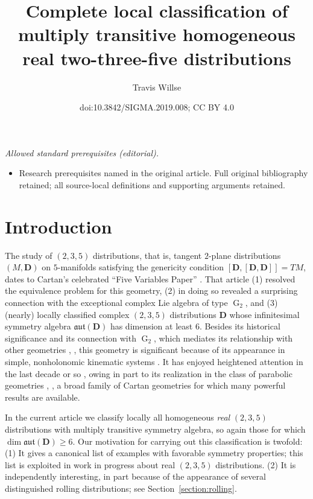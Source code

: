 \documentclass[10pt,a4paper]{amsart}
\title{Complete local classification of multiply transitive homogeneous real two-three-five distributions}
\author{Travis Willse}
\date{doi:10.3842/SIGMA.2019.008; CC BY 4.0}
\DeclareMathOperator{\G} {G}
\newcommand{\mbD}{\mathbf{D}}
\newcommand{\mfaut}{\mathfrak{aut}}
\numberwithin{equation}{section}
\begin{document}
\maketitle
\noindent\textit{Allowed standard prerequisites (editorial).}\begin{itemize}
\item Research prerequisites named in the original article. Full original bibliography retained; all source-local definitions and supporting arguments retained.
\end{itemize}\medskip
\section{Introduction}

The study of $(2, 3, 5)$ distributions, that is, tangent $2$-plane distributions $(M, \mbD)$ on $5$-manifolds satisfying the genericity condition $[\mbD, [\mbD, \mbD]] = TM$, dates to Cartan's celebrated ``Five Variables Paper'' \cite{CartanFiveVariables}. That article (1) resolved the equivalence problem for this geometry, (2) in doing so revealed a surprising connection with the exceptional complex Lie algebra of type $\G_2$, and (3) (nearly) locally classified complex $(2, 3, 5)$ distributions $\mbD$ whose infinitesimal symmetry algebra $\mfaut(\mbD)$ has dimension at least $6$. Besides its historical significance and its connection with $\G_2$, which mediates its relationship with other geometries \cite{CapSagerschnig, GPW, GrahamWillse, HammerlSagerschnig, HammerlSagerschnigTwistor, LeistnerNurowski, LNS}, \cite[Section~5]{Nurowski}, this geometry is significant because of its appearance in simple, nonholonomic kinematic systems \cite{BorMontgomery, BryantHsu}. It has enjoyed heightened attention in the last decade or so \cite{AnNurowski, AnNurowskiPlebanskiMetric, DaveHaller, DoubrovGovorovCounterexample, DHS, DoubrovKruglikov, IKTY, IKY, Randall,SagerschnigWillseOperator, SagerschnigWillseGeometry, Strazzullo, WillseHeisenberg, WillseCounterexample}, owing in part to its realization in the class of parabolic geometries \cite[Section~4.3.2]{CapSlovak}, \cite{Sagerschnig, SagerschnigThesis}, a broad family of Cartan geometries for which many powerful results are available.

In the current article we classify locally all homogeneous \textit{real} $(2, 3, 5)$ distributions with multiply transitive symmetry algebra, so again those for which $\dim \mfaut(\mbD) \geq 6$. Our motivation for carrying out this classification is twofold: (1) It gives a canonical list of examples with favorable symmetry properties; this list is exploited in work in progress about real $(2, 3, 5)$ distributions. (2) It is independently interesting, in part because of the appearance of several distinguished rolling distributions; see Section~\ref{section:rolling}.
\end{document}
